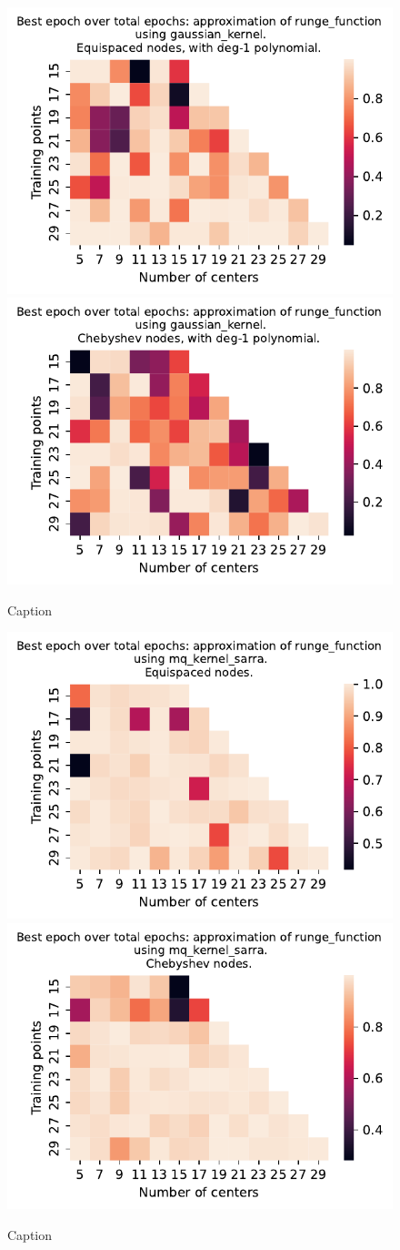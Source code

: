 \documentclass[12pt]{report} %
\begin{document}
\begin{figure}[ht]
  \centering

  \includegraphics[width=.49\textwidth]{imagenes/experiments/1d/variational_epochs/runge_function-Kgaussian_kernel-Poly-Equi-epochs.pdf}
  \includegraphics[width=.49\textwidth]{imagenes/experiments/1d/variational_epochs/runge_function-Kgaussian_kernel-Poly-Cheb-epochs.pdf}
  \caption{Caption}
  \label{fig:epochs-runge-gaussian-poly}
\end{figure}

\begin{figure}[ht]
  \centering

  \includegraphics[width=.49\textwidth]{imagenes/experiments/1d/variational_epochs/runge_function-Kmq_kernel_sarra-Equi-epochs.pdf}
  \includegraphics[width=.49\textwidth]{imagenes/experiments/1d/variational_epochs/runge_function-Kmq_kernel_sarra-Cheb-epochs.pdf}
  \caption{Caption}
  \label{fig:epochs-runge-sarra}
\end{figure}
\end{document}
